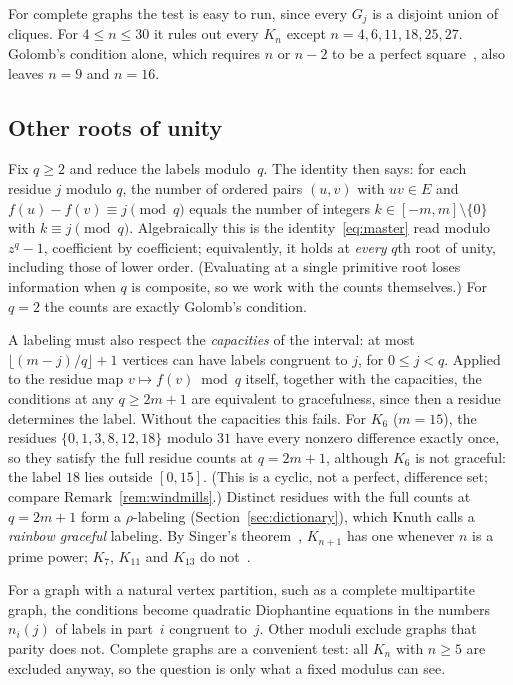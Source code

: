 \documentclass[11pt]{amsart}
\theoremstyle{tplain}
\theoremstyle{tdefinition}
\theoremstyle{tremark}
\begin{document}
For complete graphs the test is easy to run, since every $G_j$ is a disjoint
union of cliques. For $4\le n\le30$ it rules out every $K_n$ except
$n=4,6,11,18,25,27$. Golomb's condition alone, which requires $n$ or $n-2$ to
be a perfect square~\cite{golomb}, also leaves $n=9$ and $n=16$.

\subsection{Other roots of unity}\label{sec:arithmetic}

Fix $q\ge2$ and reduce the labels modulo~$q$. The identity then
says: for each residue $j$ modulo $q$, the number of ordered pairs $(u,v)$ with
$uv\in E$ and $f(u)-f(v)\equiv j\pmod q$ equals the number of integers
$k\in[-m,m]\setminus\{0\}$ with $k\equiv j\pmod q$. Algebraically this is the
identity~\eqref{eq:master} read modulo $z^q-1$, coefficient by coefficient;
equivalently, it holds at \emph{every} $q$th root of unity, including those of
lower order. (Evaluating at a single primitive root loses information when $q$
is composite, so we work with the counts themselves.) For $q=2$
the counts are exactly Golomb's condition.

A labeling must also respect the \emph{capacities} of the interval: at most
$\lfloor(m-j)/q\rfloor+1$ vertices can have labels congruent to $j$, for
$0\le j<q$. Applied to the residue map $v\mapsto f(v)\bmod q$ itself,
together with the capacities, the conditions at any $q\ge2m+1$ are equivalent
to gracefulness, since then a residue determines the label. Without the capacities this fails. For $K_6$ ($m=15$), the residues
$\{0,1,3,8,12,18\}$ modulo $31$ have every nonzero difference exactly once, so
they satisfy the full residue counts at $q=2m+1$, although $K_6$ is not
graceful: the label $18$ lies outside $[0,15]$. (This is a cyclic, not a
perfect, difference set; compare Remark~\ref{rem:windmills}.) Distinct
residues with the full counts at $q=2m+1$ form a $\rho$-labeling
(Section~\ref{sec:dictionary}), which Knuth calls a \emph{rainbow graceful}
labeling. By Singer's theorem~\cite{bjl}, $K_{n+1}$ has one whenever $n$ is
a prime power; $K_7$, $K_{11}$ and $K_{13}$ do
not~\cite[\S7.2.2.3]{knuth-pre}.

For a graph with a natural vertex partition, such as a complete multipartite
graph, the conditions become quadratic Diophantine equations in the numbers
$n_i(j)$ of labels in part~$i$ congruent to~$j$. Other moduli exclude graphs that parity does not. Complete graphs are a
convenient test: all $K_n$ with $n\ge5$ are excluded anyway, so the question
is only what a fixed modulus can see.
\end{document}
